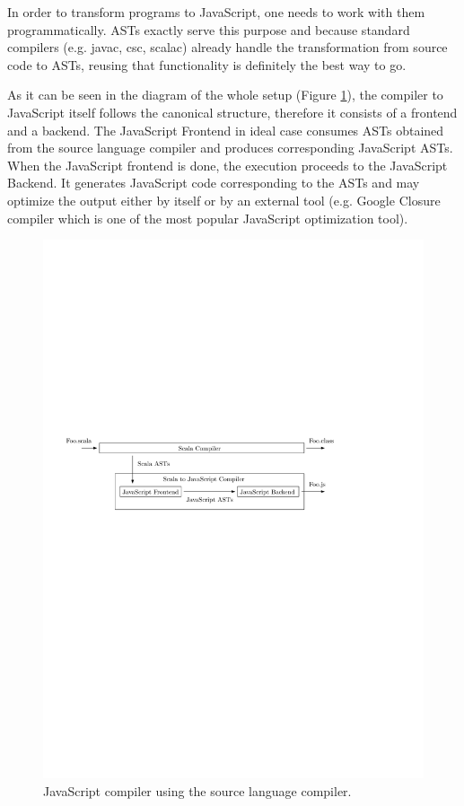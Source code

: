 \documentclass[12pt,a4paper]{report}
\begin{document}
In order to transform programs to JavaScript, one needs to work with them programmatically. ASTs exactly serve this purpose and because standard compilers (e.g. javac, csc, scalac) already handle the transformation from source code to ASTs, reusing that functionality is definitely the best way to go.

As it can be seen in the diagram of the whole setup (Figure \ref{CompilerPlugging}), the compiler to JavaScript itself follows the canonical structure, therefore it consists of a frontend and a backend. The JavaScript Frontend in ideal case consumes ASTs obtained from the source language compiler and produces corresponding JavaScript ASTs. When the JavaScript frontend is done, the execution proceeds to the JavaScript Backend. It generates JavaScript code corresponding to the ASTs and may optimize the output either by itself or by an external tool (e.g. Google Closure compiler \cite{GoogleClosure} which is one of the most popular JavaScript optimization tool).

\begin{figure}[ht]
  \centering
	\includegraphics[width=\linewidth,height=\textheight,keepaspectratio]{img/CompilerPlugging.pdf}
	\caption{JavaScript compiler using the source language compiler.}
	\label{CompilerPlugging}
\end{figure}
\end{document}
